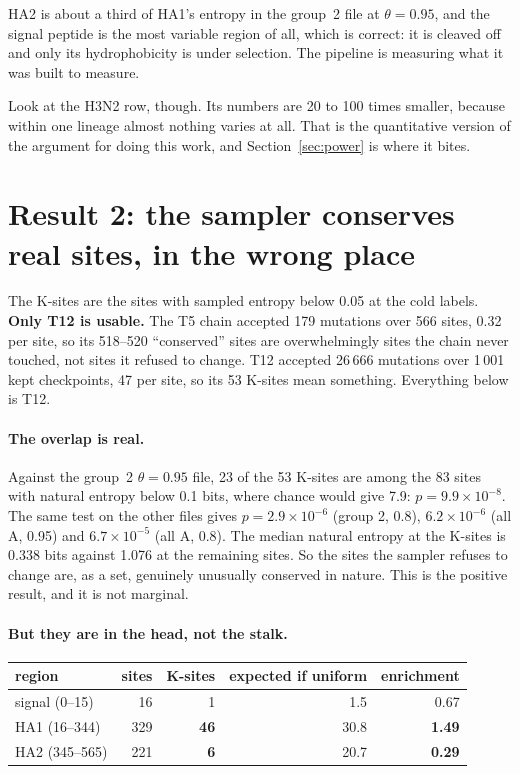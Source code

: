\documentclass[11pt,a4paper]{article}
\begin{document}
\noindent
HA2 is about a third of HA1's entropy in the group~2 file at $\theta = 0.95$,
and the signal peptide is the most variable region of all, which is correct: it
is cleaved off and only its hydrophobicity is under selection. The pipeline is
measuring what it was built to measure.

Look at the H3N2 row, though. Its numbers are 20 to 100 times smaller, because
within one lineage almost nothing varies at all. That is the quantitative
version of the argument for doing this work, and Section~\ref{sec:power} is
where it bites.

\section{Result 2: the sampler conserves real sites, in the wrong place}

The K-sites are the sites with sampled entropy below 0.05 at the cold labels.
\textbf{Only T12 is usable.} The T5 chain accepted 179 mutations over 566 sites,
0.32 per site, so its 518--520 ``conserved'' sites are overwhelmingly sites the
chain never touched, not sites it refused to change. T12 accepted 26\,666
mutations over 1\,001 kept checkpoints, 47 per site, so its 53 K-sites mean
something. Everything below is T12.

\paragraph{The overlap is real.}
Against the group~2 $\theta = 0.95$ file, 23 of the 53 K-sites are among the 83
sites with natural entropy below 0.1 bits, where chance would give 7.9:
$p = 9.9\times10^{-8}$. The same test on the other files gives
$p = 2.9\times10^{-6}$ (group 2, 0.8), $6.2\times10^{-6}$ (all A, 0.95) and
$6.7\times10^{-5}$ (all A, 0.8). The median natural entropy at the K-sites is
0.338 bits against 1.076 at the remaining sites. So the sites the sampler
refuses to change are, as a set, genuinely unusually conserved in nature. This
is the positive result, and it is not marginal.

\paragraph{But they are in the head, not the stalk.}
\begin{center}
\begin{tabular}{@{}lrrrr@{}}
\toprule
region & sites & K-sites & expected if uniform & enrichment \\
\midrule
signal (0--15)   &  16 &  1 &  1.5 & 0.67 \\
HA1 (16--344)    & 329 & \textbf{46} & 30.8 & \textbf{1.49} \\
HA2 (345--565)   & 221 & \textbf{6}  & 20.7 & \textbf{0.29} \\
\bottomrule
\end{tabular}
\end{center}
\end{document}

